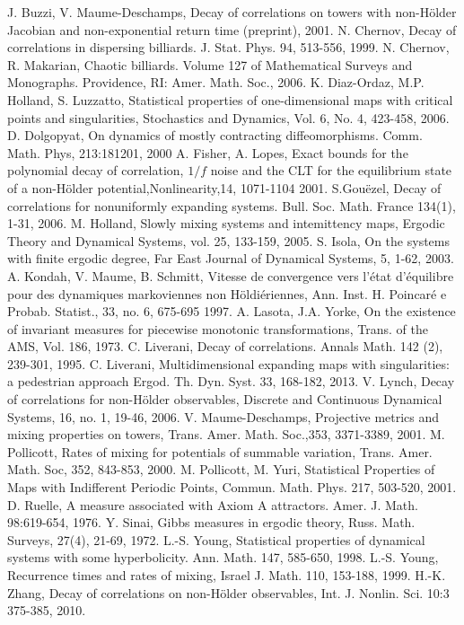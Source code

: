\documentclass[a4paper,12pt]{amsart}
\numberwithin{equation}{section}
\begin{document}
\begin{thebibliography}{99}
 J. Buzzi, V. Maume-Deschamps, Decay of correlations on towers with
non-H\"older Jacobian and non-exponential return time (preprint),
2001.
 N. Chernov, Decay of correlations in dispersing
billiards. J. Stat. Phys. 94, 513-556, 1999.
 N. Chernov, R. Makarian, Chaotic billiards. Volume 127 of Mathematical Surveys and Monographs.
Providence, RI: Amer. Math. Soc., 2006.
 K. Diaz-Ordaz, M.P. Holland, S. Luzzatto, Statistical
properties of one-dimensional maps with critical points and
singularities, Stochastics and Dynamics, Vol. 6, No. 4, 423-458,
2006.
 D. Dolgopyat, On dynamics of mostly contracting diffeomorphisms.
 Comm. Math. Phys, 213:181201, 2000
 A. Fisher, A. Lopes,
Exact bounds for the polynomial decay of correlation, $1/f$
noise and the CLT for the equilibrium state of a non-H\"older
potential,Nonlinearity,14, 1071-1104 2001.
 S.Gou\"ezel, Decay of correlations for nonuniformly
expanding systems. Bull. Soc. Math. France 134(1), 1-31, 2006.
 M. Holland, Slowly mixing systems and intemittency
maps, Ergodic Theory and Dynamical Systems, vol. 25,  133-159, 2005.
 S. Isola, On the systems with finite ergodic degree, Far East Journal of
Dynamical Systems, 5, 1-62, 2003.
 A. Kondah, V. Maume, B. Schmitt, Vitesse de convergence vers l'\'etat
d'\'equilibre pour des dynamiques markoviennes non
H\"oldi\'eriennes, Ann. Inst. H. Poincar\'e e Probab. Statist., 33,
no. 6, 675-695 1997.
 A. Lasota, J.A. Yorke, On the existence of invariant
measures for piecewise monotonic transformations, Trans. of the AMS,
Vol. 186, 1973.
 C. Liverani, Decay of correlations. Annals Math. 142 (2), 239-301, 1995.
 C. Liverani, Multidimensional expanding maps with singularities: a pedestrian approach
  Ergod. Th. Dyn. Syst. 33, 168-182, 2013.
 V. Lynch, Decay of correlations for non-H{\"o}lder observables,
Discrete and Continuous Dynamical Systems,  16, no. 1, 19-46, 2006.
 V. Maume-Deschamps, Projective metrics and mixing properties on towers,
Trans. Amer. Math. Soc.,353, 3371-3389, 2001.
 M. Pollicott, Rates of mixing for potentials of summable variation,
Trans. Amer. Math. Soc, 352, 843-853, 2000.
 M. Pollicott, M. Yuri, Statistical Properties of Maps with Indifferent
Periodic Points, Commun. Math. Phys. 217, 503-520, 2001.
 D. Ruelle, A measure associated with Axiom A attractors. Amer. J. Math.
 98:619-654, 1976.
 Y. Sinai, Gibbs measures in ergodic theory, Russ. Math.
 Surveys, 27(4), 21-69, 1972.
 L.-S. Young, Statistical properties of dynamical systems with some hyperbolicity.
 Ann. Math. 147, 585-650, 1998.
 L.-S. Young, Recurrence times and rates of mixing, Israel J. Math. 110, 153-188, 1999.
 H.-K. Zhang, Decay of correlations on non-H\"older
observables, Int. J. Nonlin. Sci. 10:3 375-385, 2010.

\end{thebibliography}
\end{document}
